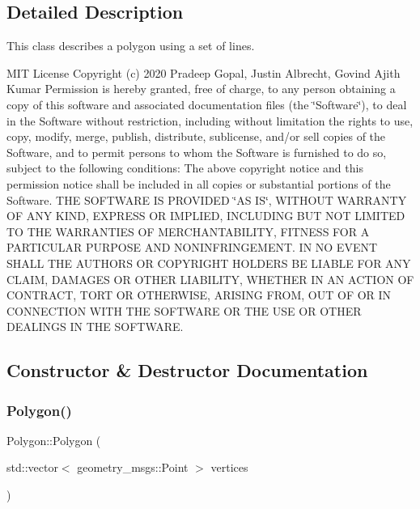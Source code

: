 \subsection{Detailed Description}
This class describes a polygon using a set of lines. 

M\+IT License Copyright (c) 2020 Pradeep Gopal, Justin Albrecht, Govind Ajith Kumar Permission is hereby granted, free of charge, to any person obtaining a copy of this software and associated documentation files (the \char`\"{}\+Software\char`\"{}), to deal in the Software without restriction, including without limitation the rights to use, copy, modify, merge, publish, distribute, sublicense, and/or sell copies of the Software, and to permit persons to whom the Software is furnished to do so, subject to the following conditions\+: The above copyright notice and this permission notice shall be included in all copies or substantial portions of the Software. T\+HE S\+O\+F\+T\+W\+A\+RE IS P\+R\+O\+V\+I\+D\+ED \char`\"{}\+A\+S I\+S\char`\"{}, W\+I\+T\+H\+O\+UT W\+A\+R\+R\+A\+N\+TY OF A\+NY K\+I\+ND, E\+X\+P\+R\+E\+SS OR I\+M\+P\+L\+I\+ED, I\+N\+C\+L\+U\+D\+I\+NG B\+UT N\+OT L\+I\+M\+I\+T\+ED TO T\+HE W\+A\+R\+R\+A\+N\+T\+I\+ES OF M\+E\+R\+C\+H\+A\+N\+T\+A\+B\+I\+L\+I\+TY, F\+I\+T\+N\+E\+SS F\+OR A P\+A\+R\+T\+I\+C\+U\+L\+AR P\+U\+R\+P\+O\+SE A\+ND N\+O\+N\+I\+N\+F\+R\+I\+N\+G\+E\+M\+E\+NT. IN NO E\+V\+E\+NT S\+H\+A\+LL T\+HE A\+U\+T\+H\+O\+RS OR C\+O\+P\+Y\+R\+I\+G\+HT H\+O\+L\+D\+E\+RS BE L\+I\+A\+B\+LE F\+OR A\+NY C\+L\+A\+IM, D\+A\+M\+A\+G\+ES OR O\+T\+H\+ER L\+I\+A\+B\+I\+L\+I\+TY, W\+H\+E\+T\+H\+ER IN AN A\+C\+T\+I\+ON OF C\+O\+N\+T\+R\+A\+CT, T\+O\+RT OR O\+T\+H\+E\+R\+W\+I\+SE, A\+R\+I\+S\+I\+NG F\+R\+OM, O\+UT OF OR IN C\+O\+N\+N\+E\+C\+T\+I\+ON W\+I\+TH T\+HE S\+O\+F\+T\+W\+A\+RE OR T\+HE U\+SE OR O\+T\+H\+ER D\+E\+A\+L\+I\+N\+GS IN T\+HE S\+O\+F\+T\+W\+A\+RE. 

\subsection{Constructor \& Destructor Documentation}
\mbox{\label{class_polygon_a31cc06303d544f460bdc89f61b2d03c2}} 
\subsubsection{\texorpdfstring{Polygon()}{Polygon()}}
{\footnotesize\ttfamily Polygon\+::\+Polygon (\begin{DoxyParamCaption}\item[{std\+::vector$<$ geometry\+\_\+msgs\+::\+Point $>$}]{vertices }\end{DoxyParamCaption})\hspace{0.3cm}{\ttfamily [explicit]}}



